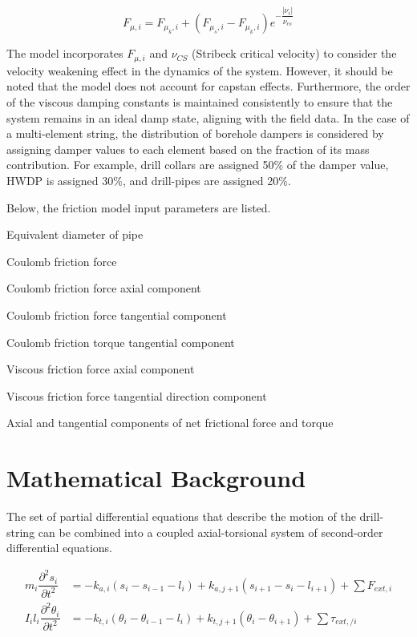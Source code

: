 \begin{equation}\label{Stribeck velocity}
  F_{\mu,i} = F_{\mu_{k},i} + (F_{\mu_{s},i} - F_{\mu_{k},i})e^{-\dfrac{|\nu_{i}|}{\nu_{cs}}}
\end{equation}

The model incorporates $F_{\mu,i}$ and $\nu_{CS}$ (Stribeck critical velocity) to consider the velocity weakening effect in the dynamics of the system. However, it should be noted that the model does not account for capstan effects. Furthermore, the order of the viscous damping constants is maintained consistently to ensure that the system remains in an ideal damp state, aligning with the field data. In the case of a multi-element string, the distribution of borehole dampers is considered by assigning damper values to each element based on the fraction of its mass contribution. For example, drill collars are assigned 50\% of the damper value, HWDP is assigned 30\%, and drill-pipes are assigned 20\%.

Below, the friction model input parameters are listed.
\begin{bulletedlist}
    \item Equivalent diameter of pipe
    \item Coulomb friction force
    \item Coulomb friction force axial component
    \item Coulomb friction force tangential component
    \item Coulomb friction torque tangential component
    \item Viscous friction force axial component
    \item Viscous friction force tangential direction component
    \item Axial and tangential components of net frictional force and torque
\end{bulletedlist}

\section{Mathematical Background}

The set of partial differential equations that describe the motion of the drill-string can be combined into a coupled axial-torsional system of second-order differential equations. 

\begin{align}\label{Governing equations}
     m_{i}\dfrac{\partial^{2}s_{i}}{\partial t^{2}} & = -k_{a,i}(s_{i}-s_{i-1}-l_{i}) + k_{a,j+1}(s_{i+1}-s_{i}-l_{i+1}) + \sum{F_{ext, i}} \\
     I_{i}l_{i}\dfrac{\partial^{2}\theta_{i}}{\partial t^{2}} & = -k_{t,i}(\theta_{i}-\theta_{i-1}-l_{i}) + k_{t,j+1}(\theta_{i}-\theta_{i+1}) + \sum{\tau_{ext,/ i}}
\end{align}

